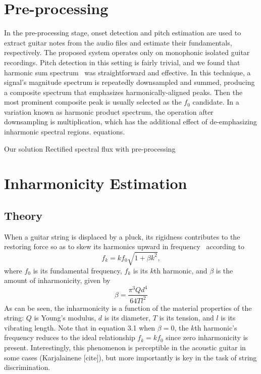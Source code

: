 \documentclass[12pt]{cmuthesis}
\begin{document}
\section{Pre-processing}
In the pre-processing stage, onset detection and pitch estimation are used to extract guitar notes from the audio files and estimate their fundamentals, respectively. The proposed system operates only on monophonic isolated guitar recordings. Pitch detection in this setting is fairly trivial, and we found that harmonic sum spectrum~\cite{noll1969} was straightforward and effective. In this technique, a signal's magnitude spectrum is repeatedly downsampled and summed, producing a composite spectrum that emphasizes harmonically-aligned peaks. Then the most prominent composite peak is usually selected as the $f_0$ candidate. In a variation known as harmonic product spectrum, the operation after downsampling is multiplication, which has the additional effect of de-emphasizing inharmonic spectral regions. equations.

Our solution Rectified spectral flux with pre-processing~\cite{bello2005,dixon2006}

\section{Inharmonicity Estimation}
\subsection{Theory}
When a guitar string is displaced by a pluck, its rigidness contributes to the restoring force so as to skew its harmonics upward in frequency~\cite{fletcher1998} according to
\begin{equation}
f_{k} = kf_{0}\sqrt{1+\beta k^{2}},
\end{equation} 
where $f_0$ is its fundamental frequency, $f_k$ is its $k$th harmonic, and $\beta$ is the amount of inharmonicity, given by
\begin{equation}
\beta = \frac{\pi^{3}Qd^{4}}{64Tl^{2}}
\end{equation}
As can be seen, the inharmonicity is a function of the material properties of the string: $Q$ is Young's modulus, $d$ is its diameter, $T$ is its tension, and $l$ is its vibrating length. Note that in equation 3.1 when $\beta = 0$, the $k$th harmonic's frequency reduces to the ideal relationship $f_{k} = kf_{0}$ since zero inharmonicity is present. Interestingly, this phenomenon is perceptible in the acoustic guitar in some cases (Karjalainene [cite]), but more importantly is key in the task of string discrimination. 
\end{document}
